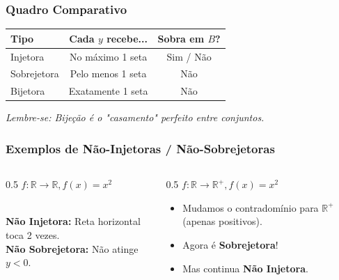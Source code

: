 \documentclass[9pt]{beamer}
\begin{document}
\begin{frame}
\frametitle{Quadro Comparativo}
\centering
\begin{table}
\begin{tabular}{|l|c|c|}
\hline
\textbf{Tipo} & \textbf{Cada $y$ recebe...} & \textbf{Sobra em $B$?} \\ \hline
Injetora & No máximo 1 seta & Sim / Não \\ \hline
Sobrejetora & Pelo menos 1 seta & Não \\ \hline
Bijetora & Exatamente 1 seta & Não \\ \hline
\end{tabular}
\end{table}

\vspace{0.5cm}
\textit{Lembre-se: Bijeção é o "casamento" perfeito entre conjuntos.}
\end{frame}

\begin{frame}
\frametitle{Exemplos de Não-Injetoras / Não-Sobrejetoras}
\begin{columns}
\begin{column}{0.5\textwidth}
\centering
$f: \mathbb{R} \to \mathbb{R}, f(x) = x^2$
\\ \tiny \textbf{Não Injetora:} Reta horizontal toca 2 vezes. \\
\tiny \textbf{Não Sobrejetora:} Não atinge $y < 0$.
\end{column}

\begin{column}{0.5\textwidth}
\centering
$f: \mathbb{R} \to \mathbb{R}^+, f(x) = x^2$
\begin{itemize}
    \item Mudamos o contradomínio para $\mathbb{R}^+$ (apenas positivos).
    \item Agora é \textbf{Sobrejetora}!
    \item Mas continua \textbf{Não Injetora}.
\end{itemize}
\end{column}
\end{columns}
\end{frame}
\end{document}
